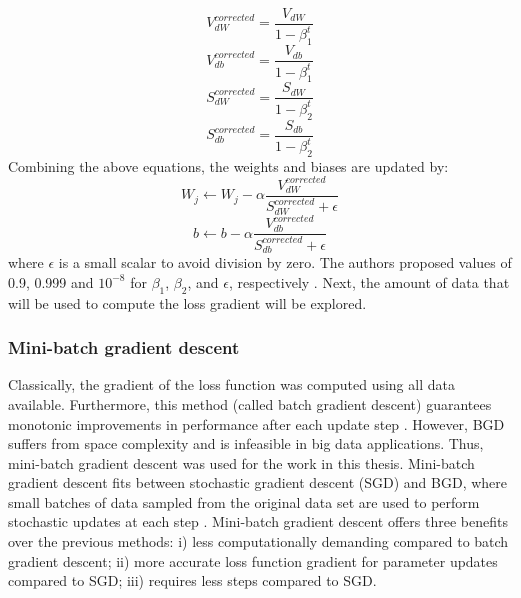 \begin{equation}
    V_{dW}^{corrected} = \frac{V_{dW}}{1 - \beta_1^t}
\end{equation}
\begin{equation}
    V_{db}^{corrected} = \frac{V_{db}}{1 - \beta_1^t}
\end{equation}
\begin{equation}
    S_{dW}^{corrected} = \frac{S_{dW}}{1 - \beta_2^t}
\end{equation}
\begin{equation}
    S_{db}^{corrected} = \frac{S_{db}}{1 - \beta_2^t}
\end{equation}
Combining the above equations, the weights and biases are updated by:
\begin{equation}
    W_j \leftarrow W_j - \alpha \frac{V_{dW}^{corrected}}{S_{dW}^{corrected} + \epsilon}
\end{equation}
\begin{equation}
    b \leftarrow b - \alpha \frac{V_{db}^{corrected}}{S_{db}^{corrected} + \epsilon}
\end{equation}
where $\epsilon$ is a small scalar to avoid division by zero. The authors proposed values of 0.9, 0.999 and $10^{-8}$ for $\beta_1$, $\beta_2$, and $\epsilon$, respectively \cite{ADAM}.  Next, the amount of data that will be used to compute the loss gradient will be explored.

\subsubsection{Mini-batch gradient descent}
Classically, the gradient of the loss function was computed using all data available. Furthermore, this method (called batch gradient descent) guarantees monotonic improvements in performance after each update step \cite{deeplearning_course}. However, BGD suffers from space complexity and is infeasible in big data applications.  Thus, mini-batch gradient descent was used for the work in this thesis. Mini-batch gradient descent fits between stochastic gradient descent (SGD) and BGD, where small batches of data sampled from the original data set are used to perform stochastic updates at each step \cite{sgd}. Mini-batch gradient descent offers three benefits over the previous methods: i) less computationally demanding compared to batch gradient descent; ii) more accurate loss function gradient for parameter updates compared to SGD; iii) requires less steps compared to SGD.



